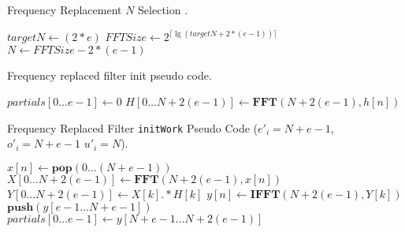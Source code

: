 \begin{algorithm}
\caption{Frequency Replacement $N$ Selection .\label{alg:freq-size}}
\begin{algorithmic}
\STATE $targetN \leftarrow (2*e)$
\STATE $FFTSize \leftarrow 2^{\lceil \lg(targetN + 2*(e-1)) \rceil}$
\STATE $N \leftarrow FFTSize - 2*(e-1)$ 
\end{algorithmic}
\end{algorithm}




\begin{algorithm}
  \caption{Frequency replaced filter init pseudo code.\label{alg:freq-init}}
  \begin{algorithmic}
    \STATE $partials[0 \dots e-1] \leftarrow 0$
    \STATE $H[0 \dots N+2(e-1)] \leftarrow \mathbf{FFT}(N+2(e-1),h[n])$
  \end{algorithmic}
\end{algorithm}

\begin{algorithm}
  \caption{Frequency Replaced Filter {\tt initWork} Pseudo Code 
  ($e'_{i}=N+e-1$, $o'_{i}=N+e-1$ $u'_{i}=N$).\label{alg:freq-init-work}}
  \begin{algorithmic}
    \STATE $x[n] \leftarrow \mathbf{pop}(0 \dots (N+e-1))$
    \STATE $X[0 \dots N+2(e-1)] \leftarrow \mathbf{FFT} (N+2(e-1), x[n])$
    \STATE $Y[0 \dots N+2(e-1)] \leftarrow X[k] .* H[k]$
    \STATE $y[n] \leftarrow \mathbf{IFFT}(N+2(e-1), Y[k])$
    \STATE $\mathbf{push}(y[e-1 \dots N+e-1])$
    \STATE $partials[0 \dots e-1] \leftarrow y[N+e-1 \dots N+2(e-1)]$
  \end{algorithmic}
\end{algorithm}


